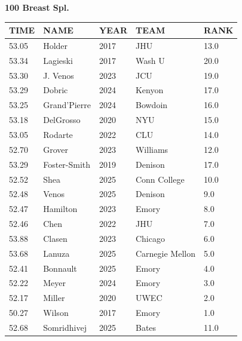 \begin{table}[H]
\centering
\begin{minipage}[t]{0.6\textwidth}
\centering
\textbf{100 Breast Spl.}\\[0.1cm]
\begin{tabular}{@{}p{1.8cm}p{2.8cm}p{1.2cm}p{1.4cm}p{0.8cm}@{}}
\hline
    \textbf{TIME} & \textbf{NAME} & \textbf{YEAR} & \textbf{TEAM} & \textbf{RANK} \\
\hline
    53.05 & Holder & 2017 & JHU & 13.0 \\
    53.34 & Lagieski & 2017 & Wash U & 20.0 \\
    53.30 & J. Venos & 2023 & JCU & 19.0 \\
    53.29 & Dobric & 2024 & Kenyon & 17.0 \\
    53.25 & Grand'Pierre & 2024 & Bowdoin & 16.0 \\
    53.18 & DelGrosso & 2020 & NYU & 15.0 \\
    53.05 & Rodarte & 2022 & CLU & 14.0 \\
    52.70 & Grover & 2023 & Williams & 12.0 \\
    53.29 & Foster-Smith & 2019 & Denison & 17.0 \\
    52.52 & Shea & 2025 & Conn College & 10.0 \\
    52.48 & Venos & 2025 & Denison & 9.0 \\
    52.47 & Hamilton & 2023 & Emory & 8.0 \\
    52.46 & Chen & 2022 & JHU & 7.0 \\
    53.88 & Clasen & 2023 & Chicago & 6.0 \\
    53.68 & Lanuza & 2025 & Carnegie Mellon & 5.0 \\
    52.41 & Bonnault & 2025 & Emory & 4.0 \\
    52.22 & Meyer & 2024 & Emory & 3.0 \\
    52.17 & Miller & 2020 & UWEC & 2.0 \\
    50.27 & Wilson & 2017 & Emory & 1.0 \\
    52.68 & Somridhivej & 2025 & Bates & 11.0 \\
\hline
\end{tabular}
\end{minipage}
\end{table}

